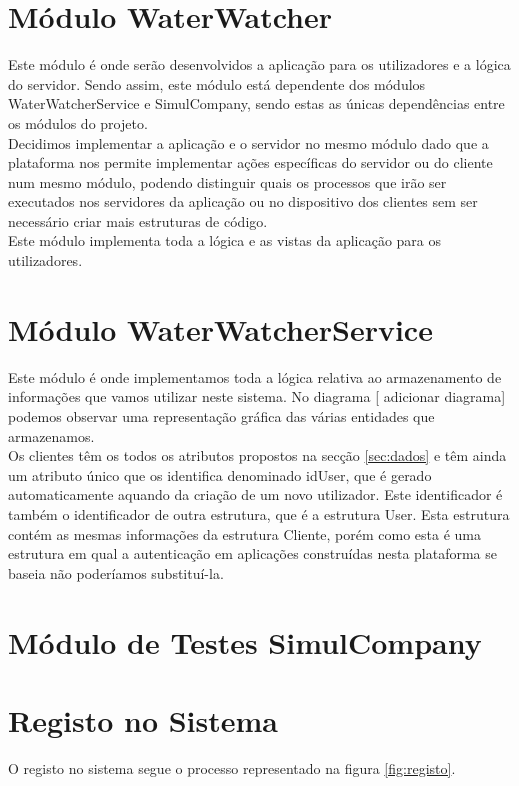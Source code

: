 \section{Módulo WaterWatcher} \label{modww} %
Este módulo é onde serão desenvolvidos a aplicação para os utilizadores e a lógica do servidor. Sendo assim, este módulo está dependente dos módulos WaterWatcherService e SimulCompany, sendo estas as únicas dependências entre os módulos do projeto.\\
Decidimos implementar a aplicação e o servidor no mesmo módulo dado que a plataforma nos permite implementar ações específicas do servidor ou do cliente num mesmo módulo, podendo distinguir quais os processos que irão ser executados nos servidores da aplicação ou no dispositivo dos clientes sem ser necessário criar mais estruturas de código.\\
Este módulo implementa toda a lógica e as vistas da aplicação para os utilizadores.

\section{Módulo WaterWatcherService} \label{modwws} %
Este módulo é onde implementamos toda a lógica relativa ao armazenamento de informações que vamos utilizar neste sistema. No diagrama [ adicionar diagrama] podemos observar uma representação gráfica das várias entidades que armazenamos.\\
Os clientes têm os todos os atributos propostos na secção \ref{sec:dados} e têm ainda um atributo único que os identifica denominado idUser, que é gerado automaticamente aquando da criação de um novo utilizador. Este identificador é também o identificador de outra estrutura, que é a estrutura User. Esta estrutura contém as mesmas informações da estrutura Cliente, porém como esta é uma estrutura em qual a autenticação em aplicações construídas nesta plataforma se baseia \cite{outs:users} não poderíamos substituí-la.

\section{Módulo de Testes SimulCompany} \label{modsc}

\section{Registo no Sistema} \label{sec51}
O registo no sistema segue o processo representado na figura \ref{fig:registo}.

